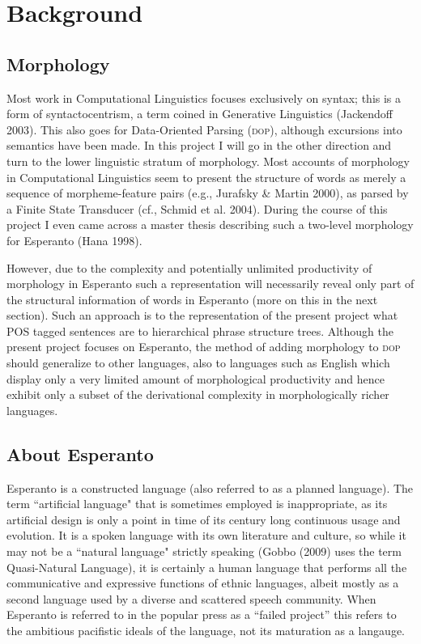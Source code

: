 \documentclass[10pt,a4paper]{article}
\begin{document}
\section{Background}
\subsection{Morphology}

Most work in Computational Linguistics focuses exclusively on syntax; this is
a form of syntactocentrism, a term coined in Generative Linguistics 
(Jackendoff 2003). This also goes for Data-Oriented Parsing (\textsc{dop}), although
excursions into semantics have been made. In this project I will go in the
other direction and turn to the lower linguistic stratum of morphology. Most
accounts of morphology in Computational Linguistics seem to present the
structure of words as merely a sequence of morpheme-feature pairs (e.g.,
Jurafsky \& Martin 2000), as parsed by a Finite State Transducer (cf., Schmid
et al.  2004). During the course of this project I even came across a master
thesis describing such a two-level morphology for Esperanto (Hana 1998).

However, due to the complexity and potentially unlimited productivity of
morphology in Esperanto such a representation will necessarily reveal
only part of the structural information of words in Esperanto (more on this
in the next section). Such an approach is to the representation of the present
project what POS tagged sentences are to hierarchical phrase structure trees.
Although the present project focuses on Esperanto, the method of adding
morphology to \textsc{dop} should generalize to other languages, also to languages
such as English which display only a very limited amount of morphological
productivity and hence exhibit only a subset of the derivational complexity in
morphologically richer languages.

\subsection{About Esperanto}

Esperanto is a constructed language (also referred to as a planned language).
The term ``artificial language" that is sometimes employed is inappropriate, as
its artificial design is only a point in time of its century long continuous
usage and evolution. It is a spoken language with its own literature and
culture, so while it may not  be a ``natural language" strictly speaking (Gobbo
(2009) uses the term Quasi-Natural Language), it is certainly a human language
that performs all the communicative and expressive functions of ethnic
languages, albeit mostly as a second language used by a diverse and scattered
speech community. When Esperanto is referred to in the popular press as a
``failed project'' this refers to the ambitious pacifistic ideals of the
language, not its maturation as a langauge.
\end{document}
